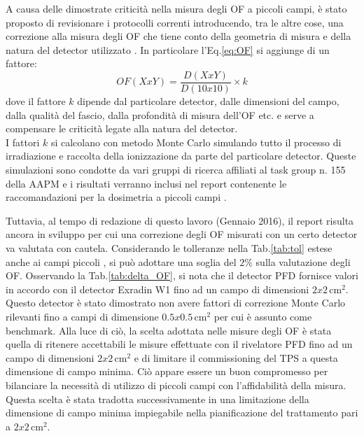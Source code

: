 A causa delle dimostrate criticità nella misura degli OF a piccoli campi, è stato proposto di revisionare i protocolli correnti introducendo, tra le altre cose, una correzione alla misura degli OF che tiene conto della geometria di misura e della natura del detector utilizzato \cite{Alfonso2008}. In particolare l'Eq.\eqref{eq:OF} si aggiunge di un fattore:
\begin{equation}
OF(XxY)=\frac{D(XxY)}{D(10x10)}\times k
\end{equation}
dove il fattore $k$ dipende dal particolare detector, dalle dimensioni del campo, dalla qualità del fascio, dalla profondità di misura dell'OF etc. e serve a compensare le criticità legate alla natura del detector.\\
I fattori $k$ si calcolano con metodo Monte Carlo simulando tutto il processo di irradiazione e raccolta della ionizzazione da parte del particolare detector. Queste simulazioni sono condotte da vari gruppi di ricerca affiliati al task group n. 155 della AAPM e i risultati verranno inclusi nel report contenente le raccomandazioni per la dosimetria a piccoli campi \cite{AAPMTG155}. 

Tuttavia, al tempo di redazione di questo lavoro (Gennaio 2016), il report risulta ancora in sviluppo per cui una correzione degli OF misurati con un certo detector va valutata con cautela. Considerando le tolleranze nella Tab.\ref{tab:tol} estese anche ai campi piccoli \cite{Low2011}, si può adottare una soglia del $2\%$ sulla valutazione degli OF. Osservando la Tab.\ref{tab:delta_OF}, si nota che il detector PFD fornisce valori in accordo con il detector Exradin W1 fino ad un campo di dimensioni $2x2\,$cm$^2$. Questo detector è stato dimostrato non avere fattori di correzione Monte Carlo rilevanti fino a campi di dimensione $0.5x0.5\,$cm$^2$ \cite{Francescon2014} per cui è assunto come benchmark. Alla luce di ciò, la scelta adottata nelle misure degli OF è stata quella di ritenere accettabili le misure effettuate con il rivelatore PFD fino ad un campo di dimensioni $2x2\,$cm$^2$ e di limitare il commissioning del TPS a questa dimensione di campo minima. Ciò appare essere un buon compromesso per bilanciare la necessità di utilizzo di piccoli campi con l'affidabilità della misura. Questa scelta è stata tradotta successivamente in una limitazione della dimensione di campo minima impiegabile nella pianificazione del trattamento pari a $2x2\,$cm$^2$.

